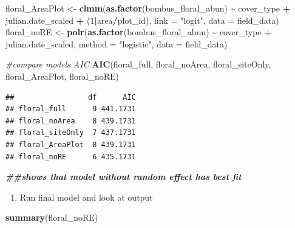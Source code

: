 \documentclass[
]{article}
\newenvironment{Shaded}{\begin{snugshade}}{\end{snugshade}}
\newcommand{\AttributeTok}[1]{\textcolor[rgb]{0.13,0.29,0.53}{#1}}
\newcommand{\CommentTok}[1]{\textcolor[rgb]{0.56,0.35,0.01}{\textit{#1}}}
\newcommand{\DecValTok}[1]{\textcolor[rgb]{0.00,0.00,0.81}{#1}}
\newcommand{\DocumentationTok}[1]{\textcolor[rgb]{0.56,0.35,0.01}{\textbf{\textit{#1}}}}
\newcommand{\FunctionTok}[1]{\textcolor[rgb]{0.13,0.29,0.53}{\textbf{#1}}}
\newcommand{\NormalTok}[1]{#1}
\newcommand{\OtherTok}[1]{\textcolor[rgb]{0.56,0.35,0.01}{#1}}
\newcommand{\SpecialCharTok}[1]{\textcolor[rgb]{0.81,0.36,0.00}{\textbf{#1}}}
\newcommand{\StringTok}[1]{\textcolor[rgb]{0.31,0.60,0.02}{#1}}
\providecommand{\tightlist}{%
  \setlength{\itemsep}{0pt}\setlength{\parskip}{0pt}}
\begin{document}
\begin{Shaded}
\begin{Highlighting}[]
\NormalTok{floral\_AreaPlot }\OtherTok{\textless{}{-}} \FunctionTok{clmm}\NormalTok{(}\FunctionTok{as.factor}\NormalTok{(bombus\_floral\_abun) }\SpecialCharTok{\textasciitilde{}}\NormalTok{ cover\_type }\SpecialCharTok{+}
\NormalTok{                         julian.date\_scaled }\SpecialCharTok{+} 
\NormalTok{                         (}\DecValTok{1}\SpecialCharTok{|}\NormalTok{area}\SpecialCharTok{/}\NormalTok{plot\_id),}
                       \AttributeTok{link =} \StringTok{"logit"}\NormalTok{, }
                       \AttributeTok{data =}\NormalTok{ field\_data)}
\NormalTok{floral\_noRE }\OtherTok{\textless{}{-}} \FunctionTok{polr}\NormalTok{(}\FunctionTok{as.factor}\NormalTok{(bombus\_floral\_abun) }\SpecialCharTok{\textasciitilde{}}\NormalTok{ cover\_type }\SpecialCharTok{+}
\NormalTok{                         julian.date\_scaled,}
                       \AttributeTok{method =} \StringTok{"logistic"}\NormalTok{, }
                       \AttributeTok{data =}\NormalTok{ field\_data)}

\CommentTok{\#compare models AIC}
\FunctionTok{AIC}\NormalTok{(floral\_full, floral\_noArea, floral\_siteOnly, floral\_AreaPlot, floral\_noRE)}
\end{Highlighting}
\end{Shaded}

\begin{verbatim}
##                 df      AIC
## floral_full      9 441.1731
## floral_noArea    8 439.1731
## floral_siteOnly  7 437.1731
## floral_AreaPlot  8 439.1731
## floral_noRE      6 435.1731
\end{verbatim}

\begin{Shaded}
\begin{Highlighting}[]
\DocumentationTok{\#\#shows that model without random effect has best fit}
\end{Highlighting}
\end{Shaded}

\begin{enumerate}
\def\labelenumi{\arabic{enumi}.}
\setcounter{enumi}{1}
\tightlist
\item
  Run final model and look at output
\end{enumerate}

\begin{Shaded}
\begin{Highlighting}[]
\FunctionTok{summary}\NormalTok{(floral\_noRE)}
\end{Highlighting}
\end{Shaded}
\end{document}

